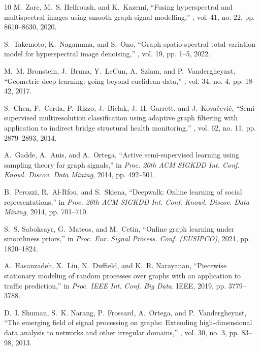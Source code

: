 \documentclass[journal]{IEEEtran}
\begin{document}
\begin{thebibliography}{10}
    M.~Zare, M.~S. Helfroush, and K.~Kazemi,
    \newblock ``Fusing hyperspectral and multispectral images using smooth graph signal modelling,''
    , vol. 41, no. 22, pp. 8610--8630, 2020.
    
    S.~Takemoto, K.~Naganuma, and S.~Ono,
    \newblock ``Graph spatio-spectral total variation model for hyperspectral image denoising,''
    , vol. 19, pp. 1--5, 2022.
    
    M.~M. Bronstein, J.~Bruna, Y.~LeCun, A.~Szlam, and P.~Vandergheynst,
    \newblock ``Geometric deep learning: going beyond euclidean data,''
    , vol. 34, no. 4, pp. 18--42, 2017.
    
    S.~Chen, F.~Cerda, P.~Rizzo, J.~Bielak, J.~H. Garrett, and J.~Kova{\v{c}}evi{\'c},
    \newblock ``Semi-supervised multiresolution classification using adaptive graph filtering with application to indirect bridge structural health monitoring,''
    , vol. 62, no. 11, pp. 2879--2893, 2014.
    
    A.~Gadde, A.~Anis, and A.~Ortega,
    \newblock ``Active semi-supervised learning using sampling theory for graph signals,''
    \newblock in {\em Proc. 20th ACM SIGKDD Int. Conf. Knowl. Discov. Data Mining}, 2014, pp. 492--501.
    
    B.~Perozzi, R.~Al-Rfou, and S.~Skiena,
    \newblock ``Deepwalk: Online learning of social representations,''
    \newblock in {\em Proc. 20th ACM SIGKDD Int. Conf. Knowl. Discov. Data Mining}, 2014, pp. 701--710.
    
    S.~S. Saboksayr, G.~Mateos, and M.~Cetin,
    \newblock ``Online graph learning under smoothness priors,''
    \newblock in {\em Proc. Eur. Signal Process. Conf. (EUSIPCO)}, 2021, pp. 1820--1824.
    
    A.~Hasanzadeh, X.~Liu, N.~Duffield, and K.~R. Narayanan,
    \newblock ``Piecewise stationary modeling of random processes over graphs with an application to traffic prediction,''
    \newblock in {\em Proc. IEEE Int. Conf. Big Data}. IEEE, 2019, pp. 3779--3788.
    
    D.~I. Shuman, S.~K. Narang, P.~Frossard, A.~Ortega, and P.~Vandergheynst,
    \newblock ``The emerging field of signal processing on graphs: Extending high-dimensional data analysis to networks and other irregular domains,''
    , vol. 30, no. 3, pp. 83--98, 2013.
    

\end{thebibliography}
\end{document}
